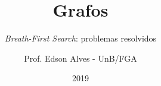 \title{Grafos}
\subtitle{\textit{Breath-First Search}: problemas resolvidos}
\author{Prof. Edson Alves - UnB/FGA}
\date{2019}

